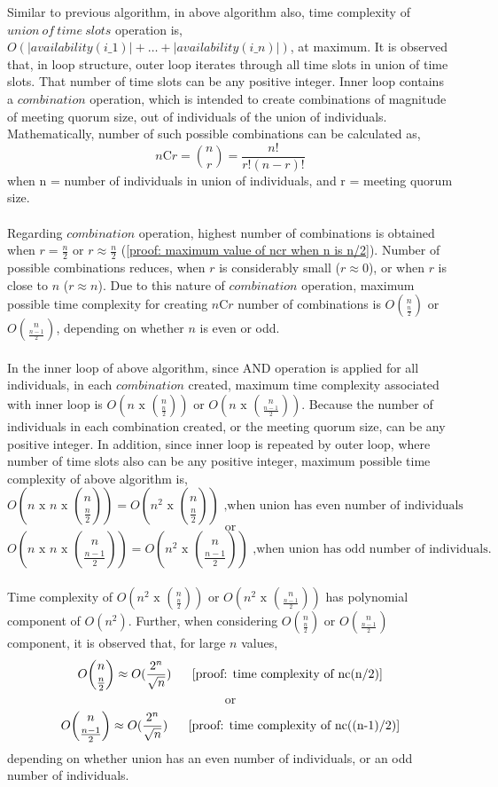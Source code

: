 Similar to previous algorithm, in above algorithm also, time complexity of $union\ of\ time\ slots$ operation is, $O(|availability(i\_1)| + \dots + |availability(i\_n)|)$, at maximum. It is observed that, in loop structure, outer loop iterates through all time slots in union of time slots. That number of time slots can be any positive integer. Inner loop contains a $combination$ operation, which is intended to create combinations of magnitude of meeting quorum size, out of individuals of the union of individuals. Mathematically, number of such possible combinations can be calculated as,
\[ n \text{C} r = \binom{n}{r} = \frac{n!}{r!(n-r)!} \]
when n = number of individuals in union of individuals, and r = meeting quorum size.\\ \\
Regarding $combination$ operation, highest number of combinations is obtained when $r = \frac{n}{2}$ or $r \approx \frac{n}{2}$ (\ref{proof: maximum value of ncr when n is n/2}). Number of possible combinations reduces, when $r$ is considerably small ($r \approx 0$), or when $r$ is close to $n$ ($r \approx n$). Due to this nature of $combination$ operation, maximum possible time complexity for creating $n \text{C} r$ number of combinations is $O\binom{n}{\frac{n}{2}}$ or $O\binom{n}{\frac{n-1}{2}}$, depending on whether $n$ is even or odd.\\ \\
In the inner loop of above algorithm, since AND operation is applied for all individuals, in each $combination$ created, maximum time complexity associated with inner loop is $O(n \text{ x } \binom{n}{\frac{n}{2}})$ or $O(n \text{ x } \binom{n}{\frac{n-1}{2}})$. Because the number of individuals in each combination created, or the meeting quorum size, can be any positive integer. In addition, since inner loop is repeated by outer loop, where number of time slots also can be any positive integer, maximum possible time complexity of above algorithm is, 
\[O(n \text{ x } n \text{ x } \binom{n}{\frac{n}{2}}) = O(n^{2} \text{ x } \binom{n}{\frac{n}{2}}) \text{ ,when union has even number of individuals} \]
\[ \text{or} \]
\[O(n \text{ x } n \text{ x } \binom{n}{\frac{n-1}{2}}) = O(n^{2} \text{ x } \binom{n}{\frac{n-1}{2}}) \text{ ,when union has odd number of individuals.} \]\\

Time complexity of $O(n^{2} \text{ x } \binom{n}{\frac{n}{2}})$ or $O(n^{2} \text{ x } \binom{n}{\frac{n-1}{2}})$ has polynomial component of $O(n^{2})$. Further, when considering $O\binom{n}{\frac{n}{2}}$ or $O\binom{n}{\frac{n-1}{2}}$ component, it is observed that, for large $n$ values, 
\[ O\binom{n}{\frac{n}{2}} \approx O(\frac{2^{n}}{\sqrt{n}}) \ \ \ \ \ \ref{proof: time complexity of nc(n/2)} \] 
\[ \text{or} \]
\[ O\binom{n}{\frac{n-1}{2}} \approx O(\frac{2^{n}}{\sqrt{n}}) \ \ \ \ \ \ref{proof: time complexity of nc((n-1)/2)} \] 
depending on whether union has an even number of individuals, or an odd number of individuals.\\

